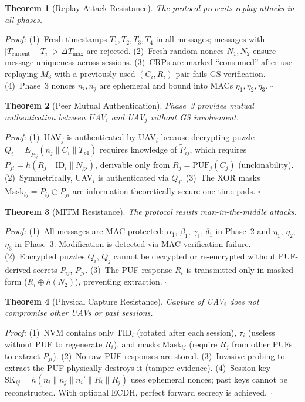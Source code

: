 \documentclass[conference]{IEEEtran}
\newtheorem{theorem}{Theorem}
\begin{document}
\begin{theorem}[Replay Attack Resistance]
\label{thm:replay}
The protocol prevents replay attacks in all phases.
\end{theorem}
\emph{Proof:} (1)~Fresh timestamps $T_1, T_2, T_3, T_4$ in all messages; messages with $|T_{\text{current}} - T_i| > \Delta T_{\max}$ are rejected. (2)~Fresh random nonces $N_1, N_2$ ensure message uniqueness across sessions. (3)~CRPs are marked ``consumed'' after use---replaying $M_3$ with a previously used $(C_i, R_i)$ pair fails GS verification. (4)~Phase~3 nonces $n_i, n_j$ are ephemeral and bound into MACs $\eta_1, \eta_2, \eta_3$. \hfill$\square$

\begin{theorem}[Peer Mutual Authentication]
\label{thm:peer}
Phase~3 provides mutual authentication between UAV$_i$ and UAV$_j$ without GS involvement.
\end{theorem}
\emph{Proof:} (1)~UAV$_j$ is authenticated by UAV$_i$ because decrypting puzzle $Q_i = E_{\tilde{P}_{ij}}(n_j \| C_i \| T_{p1})$ requires knowledge of $\tilde{P}_{ij}$, which requires $P_{ji} = h(R_j \| \text{ID}_i \| N_{\text{gs}})$, derivable only from $R_j = \text{PUF}_j(C_j)$ (unclonability). (2)~Symmetrically, UAV$_i$ is authenticated via $Q_j$. (3)~The XOR masks $\text{Mask}_{ij} = P_{ij} \oplus P_{ji}$ are information-theoretically secure one-time pads. \hfill$\square$

\begin{theorem}[MITM Resistance]
\label{thm:mitm}
The protocol resists man-in-the-middle attacks.
\end{theorem}
\emph{Proof:} (1)~All messages are MAC-protected: $\alpha_1$, $\beta_1$, $\gamma_1$, $\delta_1$ in Phase~2 and $\eta_1$, $\eta_2$, $\eta_3$ in Phase~3. Modification is detected via MAC verification failure. (2)~Encrypted puzzles $Q_i$, $Q_j$ cannot be decrypted or re-encrypted without PUF-derived secrets $P_{ij}$, $P_{ji}$. (3)~The PUF response $R_i$ is transmitted only in masked form ($R_i \oplus h(N_2)$), preventing extraction. \hfill$\square$

\begin{theorem}[Physical Capture Resistance]
\label{thm:capture}
Capture of UAV$_i$ does not compromise other UAVs or past sessions.
\end{theorem}
\emph{Proof:} (1)~NVM contains only $\text{TID}_i$ (rotated after each session), $\tau_i$ (useless without PUF to regenerate $R_i$), and masks $\text{Mask}_{ij}$ (require $R_j$ from other PUFs to extract $P_{ji}$). (2)~No raw PUF responses are stored. (3)~Invasive probing to extract the PUF physically destroys it (tamper evidence). (4)~Session key $\text{SK}_{ij} = h(n_i \| n_j \| n_i' \| R_i \| R_j)$ uses ephemeral nonces; past keys cannot be reconstructed. With optional ECDH, perfect forward secrecy is achieved. \hfill$\square$
\end{document}
